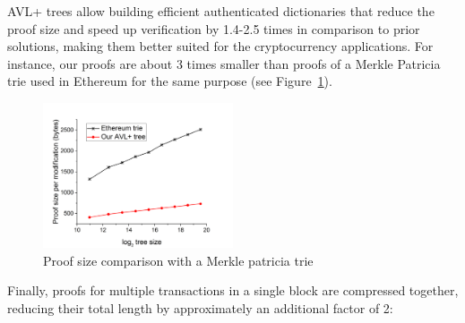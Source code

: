 AVL+ trees allow building efficient authenticated dictionaries that reduce the proof size and speed up verification by 1.4-2.5 times in comparison to prior solutions, making them better suited for the cryptocurrency applications.
For instance, our proofs are about 3 times smaller than proofs of a Merkle Patricia trie used in Ethereum for the same purpose (see Figure~\ref{fig:proofSize}).

\begin{figure}[H]
    \centering
    \includegraphics[width=0.5\textwidth]{img/proofSize.png}
    \caption{Proof size comparison with a Merkle patricia trie
    \label{fig:proofSize} }
\end{figure}

Finally, proofs for multiple transactions in a single block are compressed together, reducing their total length
by approximately an additional factor of 2:

